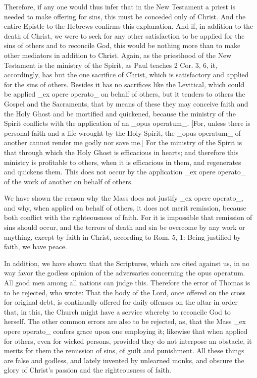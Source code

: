 Therefore, if any one would thus infer that in the New Testament a
priest is needed to make offering for sins, this must be conceded
only of Christ.  And the entire Epistle to the Hebrews confirms this
explanation.  And if, in addition to the death of Christ, we were to
seek for any other satisfaction to be applied for the sins of others
and to reconcile God, this would be nothing more than to make other
mediators in addition to Christ.  Again, as the priesthood of the New
Testament is the ministry of the Spirit, as Paul teaches 2 Cor. 3, 6,
it, accordingly, has but the one sacrifice of Christ, which is
satisfactory and applied for the sins of others.  Besides it has no
sacrifices like the Levitical, which could be applied _ex opere
operato_ on behalf of others, but it tenders to others the Gospel and
the Sacraments, that by means of these they may conceive faith and
the Holy Ghost and be mortified and quickened, because the ministry
of the Spirit conflicts with the application of an _opus operatum_.
[For, unless there is personal faith and a life wrought by the Holy
Spirit, the _opus operatum_ of another cannot render me godly nor
save me.] For the ministry of the Spirit is that through which the
Holy Ghost is efficacious in hearts; and therefore this ministry is
profitable to others, when it is efficacious in them, and regenerates
and quickens them.  This does not occur by the application _ex opere
operato_ of the work of another on behalf of others.

We have shown the reason why the Mass does not justify _ex opere
operato_, and why, when applied on behalf of others, it does not
merit remission, because both conflict with the righteousness of
faith.  For it is impossible that remission of sins should occur, and
the terrors of death and sin be overcome by any work or anything,
except by faith in Christ, according to Rom. 5, 1: Being justified by
faith, we have peace.

In addition, we have shown that the Scriptures, which are cited
against us, in no way favor the godless opinion of the adversaries
concerning the opus operatum.  All good men among all nations can
judge this.  Therefore the error of Thomas is to be rejected, who
wrote: That the body of the Lord, once offered on the cross for
original debt, is continually offered for daily offenses on the altar
in order that, in this, the Church might have a service whereby to
reconcile God to herself.  The other common errors are also to be
rejected, as, that the Mass _ex opere operato_ confers grace upon one
employing it; likewise that when applied for others, even for wicked
persons, provided they do not interpose an obstacle, it merits for
them the remission of sins, of guilt and punishment.  All these
things are false and godless, and lately invented by unlearned monks,
and obscure the glory of Christ's passion and the righteousness of
faith.

